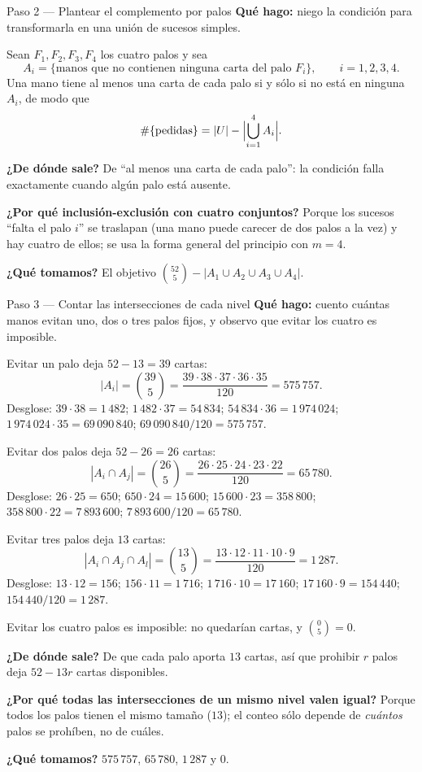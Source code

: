 \documentclass[11pt]{article}
\begin{document}
\begin{paso}{Paso 2 --- Plantear el complemento por palos}
\textbf{Qué hago:} niego la condición para transformarla en una unión de sucesos simples.

Sean $F_1,F_2,F_3,F_4$ los cuatro palos y sea
\[
A_i = \{\text{manos que no contienen ninguna carta del palo } F_i\},\qquad i=1,2,3,4 .
\]
Una mano tiene al menos una carta de cada palo si y sólo si no está en ninguna $A_i$, de modo que
\[
\#\{\text{pedidas}\} = |U| - \Bigl|\bigcup_{i=1}^{4} A_i\Bigr| .
\]

\textbf{¿De dónde sale?} De ``al menos una carta de cada palo'': la condición falla exactamente cuando algún palo está ausente.

\textbf{¿Por qué inclusión-exclusión con cuatro conjuntos?} Porque los sucesos ``falta el palo $i$'' se traslapan (una mano puede carecer de dos palos a la vez) y hay cuatro de ellos; se usa la forma general del principio con $m=4$.

\textbf{¿Qué tomamos?} El objetivo $\binom{52}{5} - |A_1\cup A_2\cup A_3\cup A_4|$.
\end{paso}

\begin{paso}{Paso 3 --- Contar las intersecciones de cada nivel}
\textbf{Qué hago:} cuento cuántas manos evitan uno, dos o tres palos fijos, y observo que evitar los cuatro es imposible.

Evitar un palo deja $52-13 = 39$ cartas:
\[
|A_i| = \binom{39}{5} = \frac{39\cdot 38\cdot 37\cdot 36\cdot 35}{120} = 575\,757 .
\]
Desglose: $39\cdot 38 = 1\,482$; $1\,482\cdot 37 = 54\,834$; $54\,834\cdot 36 = 1\,974\,024$; $1\,974\,024\cdot 35 = 69\,090\,840$; $69\,090\,840/120 = 575\,757$.

Evitar dos palos deja $52-26 = 26$ cartas:
\[
|A_i\cap A_j| = \binom{26}{5} = \frac{26\cdot 25\cdot 24\cdot 23\cdot 22}{120} = 65\,780 .
\]
Desglose: $26\cdot 25 = 650$; $650\cdot 24 = 15\,600$; $15\,600\cdot 23 = 358\,800$; $358\,800\cdot 22 = 7\,893\,600$; $7\,893\,600/120 = 65\,780$.

Evitar tres palos deja $13$ cartas:
\[
|A_i\cap A_j\cap A_l| = \binom{13}{5} = \frac{13\cdot 12\cdot 11\cdot 10\cdot 9}{120} = 1\,287 .
\]
Desglose: $13\cdot 12 = 156$; $156\cdot 11 = 1\,716$; $1\,716\cdot 10 = 17\,160$; $17\,160\cdot 9 = 154\,440$; $154\,440/120 = 1\,287$.

Evitar los cuatro palos es imposible: no quedarían cartas, y $\binom{0}{5}=0$.

\textbf{¿De dónde sale?} De que cada palo aporta $13$ cartas, así que prohibir $r$ palos deja $52-13r$ cartas disponibles.

\textbf{¿Por qué todas las intersecciones de un mismo nivel valen igual?} Porque todos los palos tienen el mismo tamaño ($13$); el conteo sólo depende de \emph{cuántos} palos se prohíben, no de cuáles.

\textbf{¿Qué tomamos?} $575\,757$, $65\,780$, $1\,287$ y $0$.
\end{paso}
\end{document}
